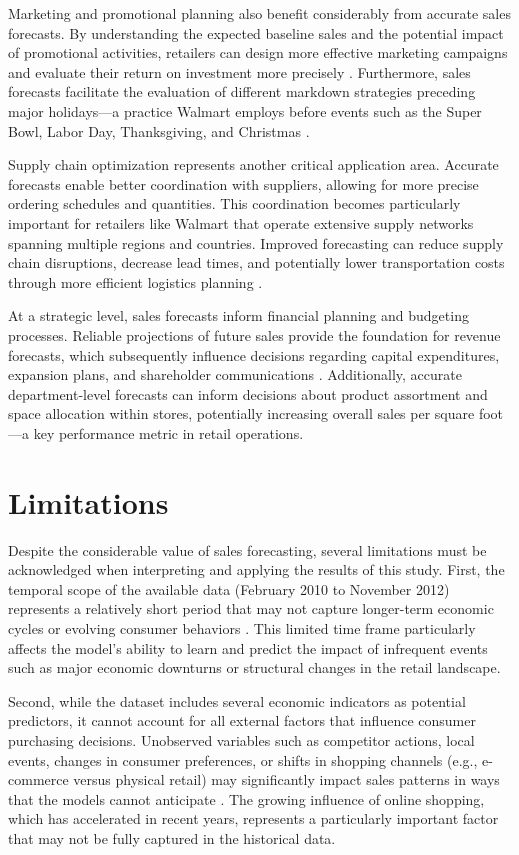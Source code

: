 Marketing and promotional planning also benefit considerably from accurate sales forecasts. By understanding the expected baseline sales and the potential impact of promotional activities, retailers can design more effective marketing campaigns and evaluate their return on investment more precisely \cite{Zhang:2021}. Furthermore, sales forecasts facilitate the evaluation of different markdown strategies preceding major holidays—a practice Walmart employs before events such as the Super Bowl, Labor Day, Thanksgiving, and Christmas \cite{Loyal:2017}.

Supply chain optimization represents another critical application area. Accurate forecasts enable better coordination with suppliers, allowing for more precise ordering schedules and quantities. This coordination becomes particularly important for retailers like Walmart that operate extensive supply networks spanning multiple regions and countries. Improved forecasting can reduce supply chain disruptions, decrease lead times, and potentially lower transportation costs through more efficient logistics planning \cite{Fildes:2019}.

At a strategic level, sales forecasts inform financial planning and budgeting processes. Reliable projections of future sales provide the foundation for revenue forecasts, which subsequently influence decisions regarding capital expenditures, expansion plans, and shareholder communications \cite{Zhang:2021}. Additionally, accurate department-level forecasts can inform decisions about product assortment and space allocation within stores, potentially increasing overall sales per square foot—a key performance metric in retail operations.

\section{Limitations}

Despite the considerable value of sales forecasting, several limitations must be acknowledged when interpreting and applying the results of this study. First, the temporal scope of the available data (February 2010 to November 2012) represents a relatively short period that may not capture longer-term economic cycles or evolving consumer behaviors \cite{Zhang:2021}. This limited time frame particularly affects the model's ability to learn and predict the impact of infrequent events such as major economic downturns or structural changes in the retail landscape.

Second, while the dataset includes several economic indicators as potential predictors, it cannot account for all external factors that influence consumer purchasing decisions. Unobserved variables such as competitor actions, local events, changes in consumer preferences, or shifts in shopping channels (e.g., e-commerce versus physical retail) may significantly impact sales patterns in ways that the models cannot anticipate \cite{Fildes:2019}. The growing influence of online shopping, which has accelerated in recent years, represents a particularly important factor that may not be fully captured in the historical data.

